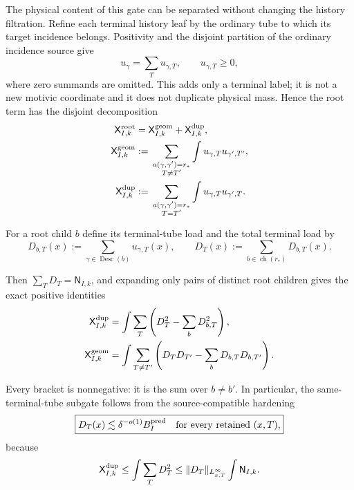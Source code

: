 \documentclass[11pt]{article}
\begin{document}
The physical content of this gate can be separated without changing the
history filtration.  Refine each terminal history leaf by the ordinary tube
to which its target incidence belongs.  Positivity and the disjoint
partition of the ordinary incidence source give
\begin{equation}\label{eq:terminal-tube-refinement}
 u_\gamma=\sum_Tu_{\gamma,T},
 \qquad u_{\gamma,T}\ge0,
\end{equation}
where zero summands are omitted.  This adds only a terminal label; it is not
a new motivic coordinate and it does not duplicate physical mass.  Hence the
root term has the disjoint decomposition
\begin{align}
 \mathsf X^{\rm root}_{I,k}
 &=\mathsf X^{\rm geom}_{I,k}
   +\mathsf X^{\rm dup}_{I,k},\label{eq:root-physical-split}\\
 \mathsf X^{\rm geom}_{I,k}
 &:={}
 \sum_{\substack{a(\gamma,\gamma')=r_\ast\\T\ne T'}}
 \int u_{\gamma,T}u_{\gamma',T'},\nonumber\\
 \mathsf X^{\rm dup}_{I,k}
 &:={}
 \sum_{\substack{a(\gamma,\gamma')=r_\ast\\T=T'}}
 \int u_{\gamma,T}u_{\gamma',T}.\nonumber
\end{align}

For a root child \(b\) define its terminal-tube load and the total terminal
load by
\begin{equation}\label{eq:root-child-terminal-load}
 D_{b,T}(x):=
 \sum_{\gamma\in\operatorname{Desc}(b)}u_{\gamma,T}(x),
 \qquad
 D_T(x):=\sum_{b\in\operatorname{ch}(r_\ast)}D_{b,T}(x).
\end{equation}

Then \(\sum_TD_T=\mathsf N_{I,k}\), and expanding only pairs of distinct
root children gives the exact positive identities
\begin{align}
 \mathsf X^{\rm dup}_{I,k}
 &=\int\sum_T
 \left(D_T^2-\sum_bD_{b,T}^2\right),
 \label{eq:duplicate-root-load-identity}\\
 \mathsf X^{\rm geom}_{I,k}
 &=\int\sum_{T\ne T'}
 \left(D_TD_{T'}-\sum_bD_{b,T}D_{b,T'}\right).
 \label{eq:geometric-root-load-identity}
\end{align}

Every bracket is nonnegative: it is the sum over \(b\ne b'\).  In particular,
the same-terminal-tube subgate follows from the source-compatible hardening
\begin{equation}\label{eq:terminal-history-hard-gate}
 \boxed{
 D_T(x)\lesssim
 \delta^{-o(1)}B_I^{\rm pred}
 \quad\text{for every retained }(x,T),}
\end{equation}
because
\[
 \mathsf X^{\rm dup}_{I,k}
 \le\int\sum_TD_T^2
 \le \|D_T\|_{L^\infty_{x,T}}\int\mathsf N_{I,k}.
\]
\end{document}
